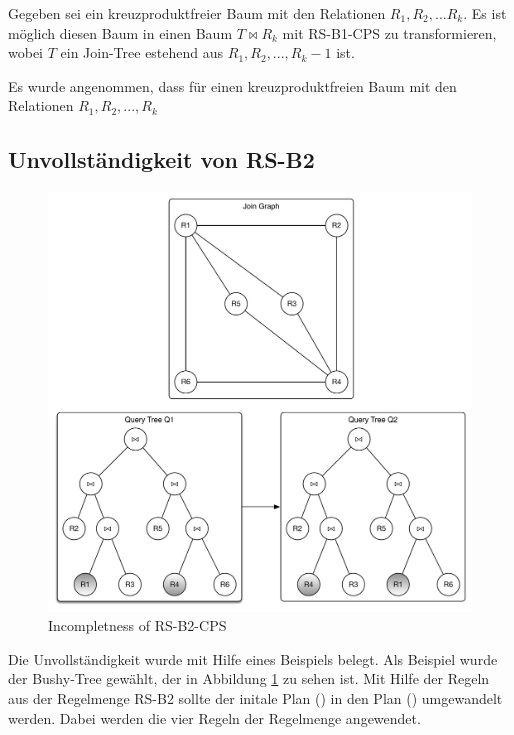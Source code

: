 \newtheorem{lem}{Lemma} 

\begin{Lemma}
Gegeben sei ein kreuzproduktfreier Baum mit den Relationen $R_1, R_2, ... R_k$. Es ist möglich diesen Baum in einen Baum $T \Join R_k$ mit RS-B1-CPS zu transformieren, wobei $T$ ein Join-Tree estehend aus $R_1, R_2, ..., R_k-1$ ist.

\end{Lemma}










Es wurde angenommen, dass für einen kreuzproduktfreien Baum mit den Relationen $R_1, R_2, ..., R_k$


\subsection{Unvollständigkeit von RS-B2}

\begin{figure}[ht]
  \centering
  \includegraphics[width=\textwidth]{02_Related_Work/Graphs.pdf}
  \caption{Incompletness of RS-B2-CPS}
  \label{Incompleteness_RS-B2-CPS}
\end{figure}


Die Unvollständigkeit wurde mit Hilfe eines Beispiels belegt. Als Beispiel wurde der Bushy-Tree gewählt, der in Abbildung \ref{Incompleteness_RS-B2-CPS} zu sehen ist. Mit Hilfe der Regeln aus der Regelmenge RS-B2 sollte der initale Plan () in den Plan () umgewandelt werden. Dabei werden die vier Regeln der Regelmenge angewendet.

